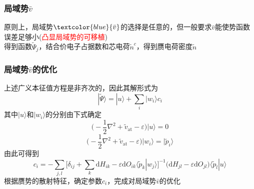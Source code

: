 {\frame
{
	\frametitle{局域势$\bar v$}
	原则上，局域势$\textcolor{blue}{\bar v}$的选择是任意的，但一般要求$\bar v$能使势函数误差足够小(\textcolor{red}{凸显局域势的可移植})\\
	\fontsize{7.2pt}{5.2pt}
	得到函数$\tilde\Psi_j$，结合价电子占据数和芯电荷$\tilde n^c$，得到赝电荷密度$\tilde n$
}

\frame
{
	\frametitle{局域势$\bar v$的优化}
	上述广义本征值方程是非齐次的，因此其解形式为
	$$|\tilde\Psi\rangle=|u\rangle+\sum_i|w_i\rangle c_i$$
	其中$|u\rangle$和$|w_i\rangle$的分别由下式确定
	$$\big(-\frac12\nabla^2+\tilde v_{\mathrm{at}}-\varepsilon\big)|u\rangle=0$$
	$$\big(-\frac12\nabla^2+\tilde v_{\mathrm{at}}-\varepsilon\big)|w_i\rangle=|\tilde p_i\rangle$$
	由此可得到
	$$c_i=-\sum_{j,l}\bigg[\delta_{ij}+\sum_k\mathrm{d}H_{ik}-\varepsilon\mathrm{d}O_{ik}\langle\tilde p_k|w_j\rangle\bigg]^{-1}\big(\mathrm{d}H_{jl}-\varepsilon\mathrm{d}O_{jl}\big)\langle\tilde p_l|u\rangle$$
	根据赝势的散射特征，确定参数$c_i$，完成对局域势$\bar v$的优化
}

}
